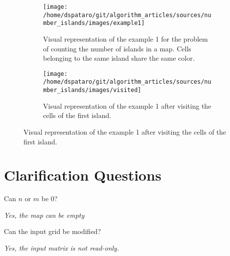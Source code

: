 \begin{figure}
	\centering
	\begin{subfigure}[t]{0.45\textwidth}
		\centering
		\texttt{[image: /home/dspataro/git/algorithm\_articles/sources/number\_islands/images/example1]}
		\caption{Visual representation of the example 1 for the problem of counting the number of islands in a map. Cells belonging to the same island share the same color.}
		\label{fig:number_islands:example1}
	\end{subfigure}
	\hfill
	\begin{subfigure}[t]{0.45\textwidth}
		\centering
		\texttt{[image: /home/dspataro/git/algorithm\_articles/sources/number\_islands/images/visited]}
		\caption{Visual representation of the example 1 after visiting the cells of the first island.}
		\label{fig:number_islands:example1_visited}
	\end{subfigure}
\end{figure}

\section{Clarification Questions}

\begin{QandA}
	\item Can $n$ or $m$ be $0$?
	\begin{answered}
		\textit{Yes, the map can be empty}
	\end{answered}
	\item Can the input grid be modified?
	\begin{answered}
		\textit{Yes, the input matrix is not read-only.}
	\end{answered}
\end{QandA}

